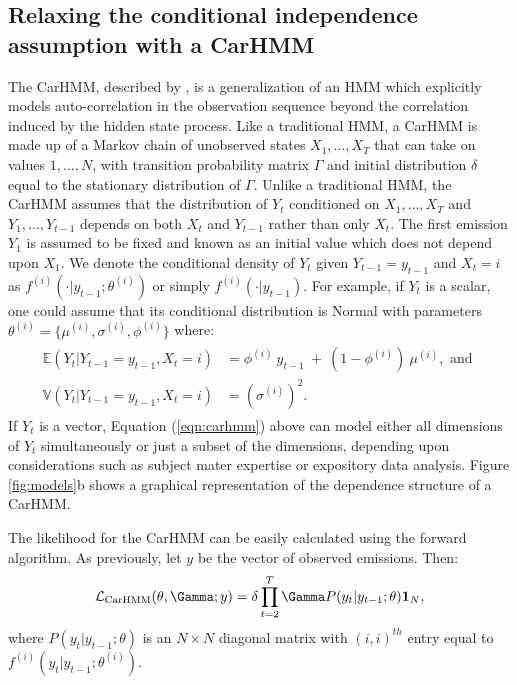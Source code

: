 \subsection{Relaxing the conditional independence assumption with a CarHMM}

The CarHMM, described by \citet{Lawler:2019}, is a generalization of an HMM which explicitly models auto-correlation in the observation sequence beyond the correlation induced by the hidden state process. Like a traditional HMM, a CarHMM is made up of a Markov chain of unobserved states $X_1,\ldots, X_T$ that can take on values $1, \ldots, N$, with transition probability matrix $\Gamma$ and initial distribution $\delta$ equal to the stationary distribution of $\Gamma$. Unlike a traditional HMM, the CarHMM assumes that the distribution of $Y_t$ conditioned on $X_1,\ldots, X_T$ and $Y_1,\ldots, Y_{t-1}$ depends on both $X_t$ and $Y_{t-1}$ rather than only $X_t$. 
The first emission $Y_1$ is assumed to be fixed and known as an initial value which does not depend upon $X_1$.
%
We denote the conditional density of $Y_t$ given $Y_{t-1} = y_{t-1}$ and $X_t=i$ as $f^{(i)}( \cdot | y_{t-1}; \theta^{(i)})$ or simply $f^{(i)}( \cdot | y_{t-1})$.
For example, if $Y_t$ is a scalar, one could assume that its conditional distribution is Normal with parameters $\theta^{(i)} = \{\mu^{(i)},\sigma^{(i)},\phi^{(i)}\}$ where:
%
\begin{align}
\label{eqn:carhmm}
\begin{split}
\mathbb{E}(Y_t|Y_{t-1} = y_{t-1},X_t=i) &= \phi^{(i)} ~ y_{t-1} ~+ ~(1-\phi^{(i)})  ~\mu^{(i)}, \text{ and } \\
\mathbb{V}(Y_t| Y_{t-1} = y_{t-1}, X_t = i) &= (\sigma^{(i)})^2.
\end{split}
\end{align}
%
If $Y_t$ is a vector, Equation (\ref{eqn:carhmm}) above can model either all dimensions of $Y_t$ simultaneously or just a subset of the dimensions, depending upon considerations such as subject mater expertise or expository data analysis. Figure \ref{fig:models}b shows a graphical representation of the dependence structure of a CarHMM.

The likelihood for the CarHMM can be easily calculated using the forward algorithm. As previously, let $y$ be the vector of observed emissions. Then:
\begin{equation*}
    \calL_{\text{CarHMM}}(\theta,\Gamma;y) = \delta \prod_{t=2}^T \Gamma P(y_t|y_{t-1};\theta) \mathbf{1}_N,
    \label{eqn:CarHMM_likelihood}
\end{equation*}
where
%
$P(y_t|y_{t-1};\theta)$ is an $N \times N$ diagonal matrix with $(i,i)^{th}$ entry equal to $f^{(i)}(y_t|y_{t-1}; \theta^{(i)})$.

